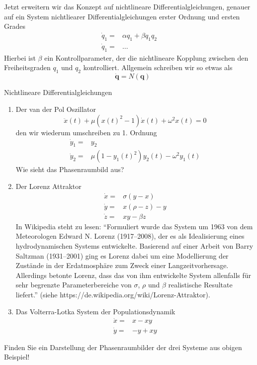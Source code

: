 Jetzt erweitern wir das Konzept auf nichtlineare Differentialgleichungen,
genauer auf ein System nichtliearer Differentialgleichungen erster Ordnung und
ersten Grades
\begin{align*}
\dot q_1 =& \alpha q_1 + \beta q_1q_2\\
\dot q_1 =&\dots
\end{align*}
Hierbei ist $\beta$ ein Kontrollparameter, der die nichtlineare Kopplung
zwischen den Freiheitsgraden $q_1$ und $q_2$ kontrolliert. Allgemein schreiben
wir so etwas als
\begin{equation}
  \quad\dot{\mathbf{q}}=N(\mathbf{q})
  \label{eq:NLDGLSystem}
\end{equation}
\begin{example}{Nichtlineare Differentialgleichungen}
  \begin{enumerate}
   \item Der van der Pol Oszillator
    \[\ddot x(t)+\mu(x(t)^2-1)\dot x(t)+\omega^2x(t)=0 \]
    den wir wiederum umschreiben zu 1. Ordnung
    \begin{align*}
     \dot y_1=&y_2\\
     \dot y_2=&\mu(1-y_1(t)^2) y_2(t)-\omega^2y_1(t)
    \end{align*}
    Wie sieht das Phasenraumbild aus?
   \item Der Lorenz Attraktor
     \begin{align*}
       \dot x=&\sigma(y-x)\\
       \dot y=&x(\rho-z)-y\\
     \dot z=&xy-\beta z
    \end{align*}
     In Wikipedia steht zu lesen:
     ``Formuliert wurde das System um 1963 von dem Meteorologen Edward N. Lorenz
     (1917–2008), der es als Idealisierung eines hydrodynamischen Systems
     entwickelte. Basierend auf einer Arbeit von Barry Saltzman (1931–2001)
     ging es Lorenz dabei um eine Modellierung der Zustände in der
     Erdatmosphäre zum Zweck einer Langzeitvorhersage. Allerdings betonte
     Lorenz, dass das von ihm entwickelte System allenfalls für sehr begrenzte
     Parameterbereiche von $\sigma$, $\rho$ und $\beta$ realistische
      Resultate liefert.'' (siehe https://de.wikipedia.org/wiki/Lorenz-Attraktor).
   \item Das Volterra-Lotka System der Populationsdynamik
     \begin{align*}
       \dot x=&x-xy\\
       \dot y=&-y+xy
     \end{align*}
  \end{enumerate}
\end{example}
Finden Sie ein Darstellung der Phasenraumbilder der drei Systeme aus obigen
Beispiel!

